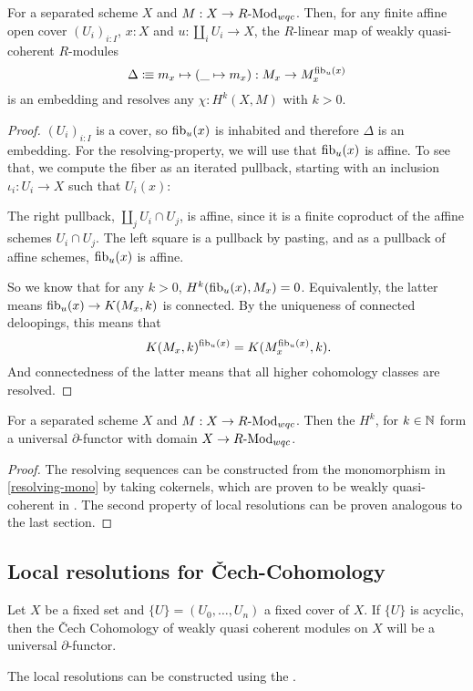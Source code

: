 \begin{remark}
  \label{resolving-mono}
  For a separated scheme $X$ and $M:X\to R\text{-}\mathrm{Mod}_{wqc}$.
  Then, for any finite affine open cover $(U_i)_{i:I}$, $x:X$
  and $u:\coprod_i U_i\to X$,
  the $R$-linear map of weakly quasi-coherent $R$-modules
  \[ \Delta\vcentcolon\mspace{-1.2mu}\equiv m_x\mapsto (\_\mapsto m_x):M_x\to M_x^{\mathrm{fib}_u(x)}\]
  is an embedding and resolves any $\chi:H^k(X,M)$ with $k>0$.
\end{remark}

\begin{proof}
  $(U_i)_{i:I}$ is a cover, so $\mathrm{fib}_u(x)$ is inhabited and therefore $\Delta$ is an embedding.
  For the resolving-property, we will use that $\mathrm{fib}_u(x)$ is affine.
  To see that,
  we compute the fiber as an iterated pullback,
  starting with an inclusion $\iota_i:U_i\to X$ such that $U_i(x)$:
  \begin{center}
  \end{center}
  The right pullback, $\coprod_j U_i\cap U_j$, is affine, since it is a finite coproduct of the affine schemes $U_i\cap U_j$.
  The left square is a pullback by pasting, and as a pullback of affine schemes, $\mathrm{fib}_u(x)$ is affine.

  So we know that for any $k>0$, $H^k(\mathrm{fib}_u(x),M_x)=0$.
  Equivalently, the latter means $\mathrm{fib}_u(x)\to K(M_x,k)$ is connected.
  By the uniqueness of connected deloopings, this means that
  \[
    K(M_x,k)^{\fib_u(x)} = K(M_x^{\fib_u(x)},k)
    \rlap{.}
  \]
  And connectedness of the latter means that all higher cohomology classes are resolved.
\end{proof}

\begin{theorem}
  For a separated scheme $X$ and $M:X\to R\text{-}\mathrm{Mod}_{wqc}$.
  Then the $H^k$, for $k\in\mathbb{N}$ form a universal $\partial$-functor with domain $X\to R\text{-}\mathrm{Mod}_{wqc}$.
\end{theorem}

\begin{proof}
  The resolving sequences can be constructed from the monomorphism in \cref{resolving-mono}
  by taking cokernels, which are proven to be weakly quasi-coherent in \cite{draft}.
  The second property of local resolutions can be proven analogous to the last section.
\end{proof}

\subsection{Local resolutions for \v{C}ech-Cohomology}

Let $X$ be a fixed set and $\{U\}=(U_0,\dots,U_n)$ a fixed cover of $X$.
If $\{U\}$ is acyclic, then the \v{C}ech Cohomology of weakly quasi coherent modules on $X$
will be a universal $\partial$-functor.

The local resolutions can be constructed using the .
